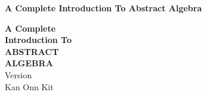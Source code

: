 \makeatletter\newcommand*{\rom}[1]{\Ifstr{#1}{0}{0}{\expandafter\@slowromancap\romannumeral #1@}}\makeatother

\thispagestyle{empty}
\null\vspace{4cm}
\begin{raggedleft}
    {\fontsize{24pt}{0pt}\selectfont \textbf{A Complete Introduction To Abstract Algebra}}\\
\end{raggedleft}

\begin{titlepage}
    \null\vspace{4cm}
    \begin{raggedleft}
        {\fontsize{20pt}{0pt}\selectfont \textbf{A Complete}\\\textbf{Introduction To}}\\

        \vspace{0.4cm}
        {\fontsize{48pt}{0pt}\selectfont \textbf{ABSTRACT}}\\
        \vspace{0.15cm}
        {\fontsize{48pt}{0pt}\selectfont \textbf{ALGEBRA}}\\

        \vspace{0.5cm}
        {\fontsize{16pt}{0pt}\selectfont Version \version}\\
        
        \vspace{1.25cm}
        {\fontsize{20pt}{0pt}\selectfont Kan Onn Kit}\\
    \end{raggedleft}
    \vspace*{\fill}
\end{titlepage}

\newpage{}

